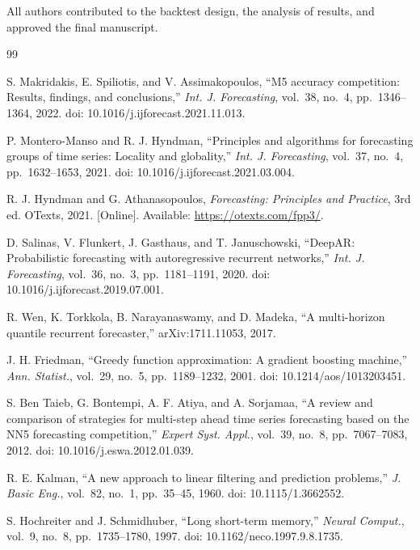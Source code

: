\documentclass[conference]{IEEEtran}
\begin{document}
\vspace{4pt}\noindent All authors contributed to the backtest design, the analysis of results, and
approved the final manuscript.

\begin{thebibliography}{99}

 S. Makridakis, E. Spiliotis, and V. Assimakopoulos, ``M5 accuracy
  competition: Results, findings, and conclusions,'' \emph{Int. J. Forecasting}, vol.~38, no.~4,
  pp.~1346--1364, 2022. doi: 10.1016/j.ijforecast.2021.11.013.

 P. Montero-Manso and R. J. Hyndman, ``Principles and algorithms for
  forecasting groups of time series: Locality and globality,'' \emph{Int. J. Forecasting}, vol.~37,
  no.~4, pp.~1632--1653, 2021. doi: 10.1016/j.ijforecast.2021.03.004.

 R. J. Hyndman and G. Athanasopoulos, \emph{Forecasting: Principles and
  Practice}, 3rd ed. OTexts, 2021. [Online]. Available: \url{https://otexts.com/fpp3/}.

 D. Salinas, V. Flunkert, J. Gasthaus, and T. Januschowski, ``DeepAR:
  Probabilistic forecasting with autoregressive recurrent networks,'' \emph{Int. J. Forecasting},
  vol.~36, no.~3, pp.~1181--1191, 2020. doi: 10.1016/j.ijforecast.2019.07.001.

 R. Wen, K. Torkkola, B. Narayanaswamy, and D. Madeka, ``A multi-horizon quantile
  recurrent forecaster,'' arXiv:1711.11053, 2017.

 J. H. Friedman, ``Greedy function approximation: A gradient boosting
  machine,'' \emph{Ann. Statist.}, vol.~29, no.~5, pp.~1189--1232, 2001. doi:
  10.1214/aos/1013203451.

 S. Ben Taieb, G. Bontempi, A. F. Atiya, and A. Sorjamaa, ``A review and
  comparison of strategies for multi-step ahead time series forecasting based on the NN5 forecasting
  competition,'' \emph{Expert Syst. Appl.}, vol.~39, no.~8, pp.~7067--7083, 2012. doi:
  10.1016/j.eswa.2012.01.039.

 R. E. Kalman, ``A new approach to linear filtering and prediction problems,''
  \emph{J. Basic Eng.}, vol.~82, no.~1, pp.~35--45, 1960. doi: 10.1115/1.3662552.

 S. Hochreiter and J. Schmidhuber, ``Long short-term memory,'' \emph{Neural
  Comput.}, vol.~9, no.~8, pp.~1735--1780, 1997. doi: 10.1162/neco.1997.9.8.1735.


\end{thebibliography}
\end{document}
